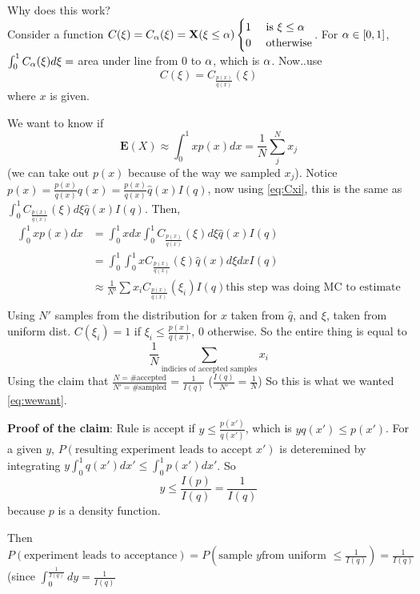 Why does this work? \\Consider a function $C(\xi) = C_\alpha(\xi) =
\mathbf{X}(\xi \le \alpha)
\begin{cases}
  1&\text{ is }\xi \le \alpha \\
0 & \text{ otherwise}
\end{cases}$. For $\alpha\in [0,1]$, $\int_0^1C_\alpha(\xi)d\xi =$ area under line from 0
to $\alpha$, which is $\alpha$. Now..use
\begin{equation}
  \label{eq:Cxi}
C(\xi) =
C_{\frac{p(x)}{q(x)}}(\xi)
\end{equation}
where $x$ is given.

We want to know if 
\begin{equation}
  \label{eq:wewant}
\mathbf{E}(X) \approx \int_0^1xp(x)dx =
\frac{1}{N}\sum_j^Nx_j
\end{equation}
 (we can take out $p(x)$ because of the way we
sampled $x_j$). Notice $p(x) = \frac{p(x)}{q(x)}q(x) =
\frac{p(x)}{q(x)}\hat q(x)I(q)$, now using \ref{eq:Cxi}, this is the
same as $\int_0^1C_{\frac{p(x)}{q(x)}}(\xi)d\xi \hat q(x)I(q)$.
Then,
\begin{align*}
\int_0^1xp(x)dx &=
\int_0^1xdx \int_0^1C_{\frac{p(x)}{q(x)}}(\xi)d\xi \hat q(x) I(q)\\
&=\int_0^1\int_0^1x C_{\frac{p(x)}{q(x)}}(\xi)\hat q(x)d\xi dx I(q)\\
&\approx \frac{1}{N'}\sum x_i C_{\frac{p(x)}{q(x)}}(\xi_i)I(q)\text{
  this step was doing MC to estimate}\\
\end{align*}
Using $N'$ samples from the distribution for $x$ taken from $\hat q$,
and $\xi$, taken from uniform dist. $C(\xi_i)=1$ if $\xi_i \le
\frac{p(x)}{q(x)}$, 0 otherwise. So the entire thing is equal to 
$$
\frac{1}{N}\sum_{\text{indicies of accepted samples}}x_i
$$
Using the claim that $\frac{N=\text{\# accepted}}{N'=\text{\# sampled}}
= \frac{1}{I(q)}$
($\frac{I(q)}{N'} = \frac{1}{N}$) So this is what we wanted \ref{eq:wewant}.

\textbf{Proof of the claim}: Rule is accept if $y\le
\frac{p(x')}{q(x')}$, which is $yq(x')\le p(x')$.
For a given $y$, $P(\text{resulting experiment leads to accept }x')$ is deteremined by integrating
$y\int_0^1q(x')dx' \le \int_0^1p(x')dx'$. So
$$y \le \frac{I(p)}{I(q)} = \frac{1}{I(q)}$$ because $p$ is a density
function.

Then $P(\text{experiment leads to acceptance}) = P(\text{sample $y$
  from uniform }\le \frac{1}{I(q)}) = \frac{1}{I(q)}$ (since
  $\int_0^{\frac{1}{I(q)}}dy = \frac{1}{I(q)}$

